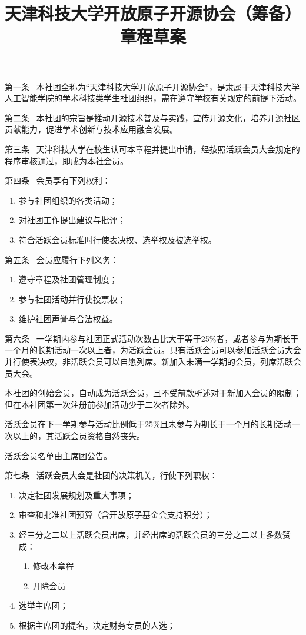 \documentclass{gbt9704}
\title{天津科技大学开放原子开源协会（筹备）章程草案}
\begin{document}
\maketitle


第一条~ 本社团全称为“天津科技大学开放原子开源协会”，是隶属于天津科技大学人工智能学院的学术科技类学生社团组织，需在遵守学校有关规定的前提下活动。


第二条~ 本社团的宗旨是推动开源技术普及与实践，宣传开源文化，培养开源社区贡献能力，促进学术创新与技术应用融合发展。


第三条~ 天津科技大学在校生认可本章程并提出申请，经按照活跃会员大会规定的程序审核通过，即成为本社会员。


第四条~ 会员享有下列权利：
\begin{enumerate}
    \item 参与社团组织的各类活动；
    \item 对社团工作提出建议与批评；
    \item 符合活跃会员标准时行使表决权、选举权及被选举权。
\end{enumerate}


第五条~ 会员应履行下列义务：
\begin{enumerate}
    \item 遵守章程及社团管理制度；
    \item 参与社团活动并行使投票权；
    \item 维护社团声誉与合法权益。
\end{enumerate}


第六条~ 一学期内参与社团正式活动次数占比大于等于25\%者，或者参与为期长于一个月的长期活动一次以上者，为活跃会员。只有活跃会员可以参加活跃会员大会并行使表决权，非活跃会员可以自愿列席。新加入未满一学期的会员，列席活跃会员大会。


本社团的创始会员，自动成为活跃会员，且不受前款所述对于新加入会员的限制；但在本社团第一次注册前参加活动少于二次者除外。


活跃会员在下一学期参与活动比例低于25\%且未参与为期长于一个月的长期活动一次以上的，其活跃会员资格自然丧失。


活跃会员名单由主席团公告。


第七条~ 活跃会员大会是社团的决策机关，行使下列职权：
\begin{enumerate}
    \item 决定社团发展规划及重大事项；
    \item 审查和批准社团预算（含开放原子基金会支持积分）；
    \item 经三分之二以上活跃会员出席，并经出席的活跃会员的三分之二以上多数赞成：
        \begin{enumerate}
            \item 修改本章程
            \item 开除会员
        \end{enumerate}
    \item 选举主席团；
    \item 根据主席团的提名，决定财务专员的人选；
\end{enumerate}
\end{document}
